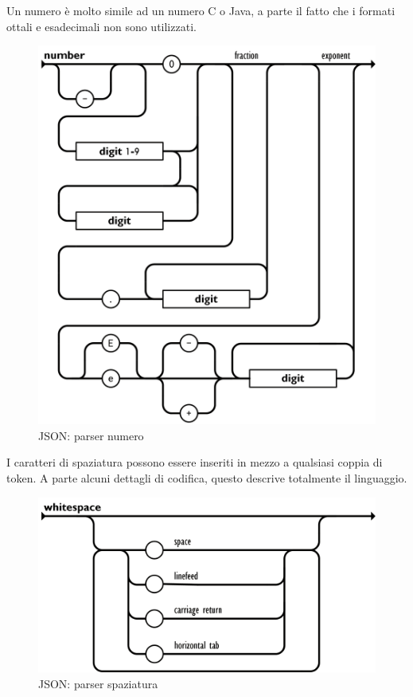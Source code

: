 \documentclass[11pt,a4paper]{book}
\begin{document}
\clearpage
Un numero è molto simile ad un numero C o Java, a parte il fatto che i formati ottali e esadecimali non sono utilizzati.
\begin{figure}[h!]
	\begin{center}
		\includegraphics[scale=0.6]{img/006.png}
		\caption{JSON: parser numero}
		\label{fig: 006}
	\end{center}
\end{figure}

\clearpage
I caratteri di spaziatura possono essere inseriti in mezzo a qualsiasi coppia di token. A parte alcuni dettagli di codifica, questo descrive totalmente il linguaggio.
\begin{figure}[h!]
	\begin{center}
		\includegraphics[scale=0.6]{img/007.png}
		\caption{JSON: parser spaziatura}
		\label{fig: 007}
	\end{center}
\end{figure}
\clearpage
\end{document}

